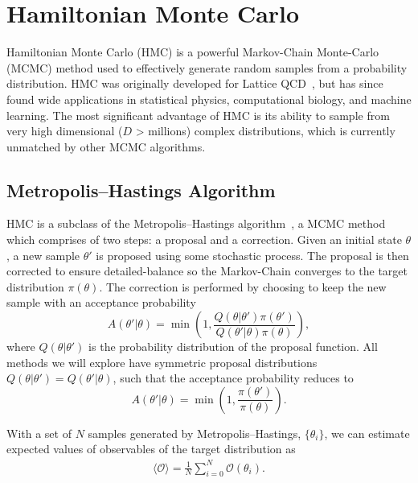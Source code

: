 \documentclass[11pt]{article}
\begin{document}
\section{Hamiltonian Monte Carlo}\label{sec:hamiltonian_monte_carlo}
    Hamiltonian Monte Carlo (HMC) is a powerful Markov-Chain Monte-Carlo (MCMC) method used to effectively generate
    random samples from a probability distribution.
    HMC was originally developed for Lattice QCD~\cite{HMC_Duane}, but has since found wide applications in statistical
    physics, computational biology, and machine learning.
    The most significant advantage of HMC is its ability to sample from very high dimensional ($D$ > millions)
    complex distributions, which is currently unmatched by other MCMC algorithms.

\subsection{Metropolis--Hastings Algorithm}\label{subsec:metropolis_hastings}
    HMC is a subclass of the Metropolis--Hastings algorithm~\cite{Metropolis_OG}, a MCMC method which comprises of two
    steps: a proposal and a correction.
    Given an initial state $\theta$, a new sample $\theta'$ is proposed using some stochastic process.
    The proposal is then corrected to ensure detailed-balance so the Markov-Chain converges to the
    target distribution $\pi(\theta)$.
    The correction is performed by choosing to keep the new sample with an acceptance probability
    \begin{equation}\label{eq:metropolis_hastings}
        A(\theta' | \theta) = \min \left(1, \frac{Q(\theta | \theta') \pi(\theta') }{Q(\theta' | \theta) \pi(\theta) } \right),
    \end{equation}
    where $Q(\theta | \theta')$ is the probability distribution of the proposal function.
    All methods we will explore have symmetric proposal distributions $Q(\theta | \theta') = Q(\theta' | \theta)$,
    such that the acceptance probability reduces to
    \begin{equation}\label{eq:metropolis}
        A(\theta' | \theta) = \min \left(1, \frac{\pi(\theta') }{\pi(\theta) } \right).
    \end{equation}

    With a set of $N$ samples generated by Metropolis--Hastings, $\{ \theta_i \}$, we can estimate expected values of observables
    of the target distribution as
    \begin{equation}\label{eq:mcmc_observable}
    \begin{aligned}
        \langle \mathcal{O} \rangle = \frac{1}{N}\sum_{i=0}^N \mathcal{O}(\theta_i).
    \end{aligned}
    \end{equation}
\end{document}
